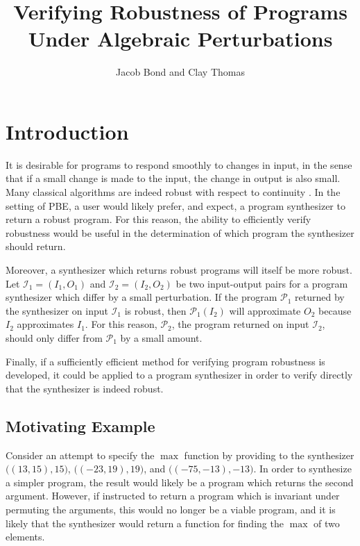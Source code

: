 \documentclass{llncs}
\title{Verifying Robustness of Programs Under Algebraic Perturbations}
\author{Jacob Bond and Clay Thomas}
\institute{Purdue University}
\begin{document}
\maketitle 


\section{Introduction}

It is desirable for programs to respond smoothly to changes in input, in the sense that if a small change is made to the input, the change in output is also small.  Many classical algorithms are indeed robust with respect to continuity \cite{chaudhuri11}.  In the setting of PBE, a user would likely prefer, and expect, a program synthesizer to return a robust program.  For this reason, the ability to efficiently verify robustness would be useful in the determination of which program the synthesizer should return.

Moreover, a synthesizer which returns robust programs will itself be more robust.  Let \(\mathcal{I}_{1} = (I_{1}, O_{1})\) and \(\mathcal{I}_{2} = (I_{2}, O_{2})\) be two input-output pairs for a program synthesizer which differ by a small perturbation.  If the program \(\mathcal{P}_{1}\) returned by the synthesizer on input \(\mathcal{I}_{1}\) is robust, then \(\mathcal{P}_{1}(I_{2})\) will approximate \(O_{2}\) because \(I_{2}\) approximates \(I_{1}\).  For this reason, \(\mathcal{P}_{2}\), the program returned on input \(\mathcal{I}_{2}\), should only differ from \(\mathcal{P}_{1}\) by a small amount.

Finally, if a sufficiently efficient method for verifying program robustness is developed, it could be applied to a program synthesizer in order to verify directly that the synthesizer is indeed robust.

\subsection{Motivating Example}

Consider an attempt to specify the \(\max\) function by providing to the synthesizer \(\Big((13, 15), 15\Big)\), \(\Big((-23, 19), 19\Big)\), and \(\Big((-75, -13), -13\Big)\).  In order to synthesize a simpler program, the result would likely be a program which returns the second argument.  However, if instructed to return a program which is invariant under permuting the arguments, this would no longer be a viable program, and it is likely that the synthesizer would return a function for finding the \(\max\) of two elements.
\end{document}
